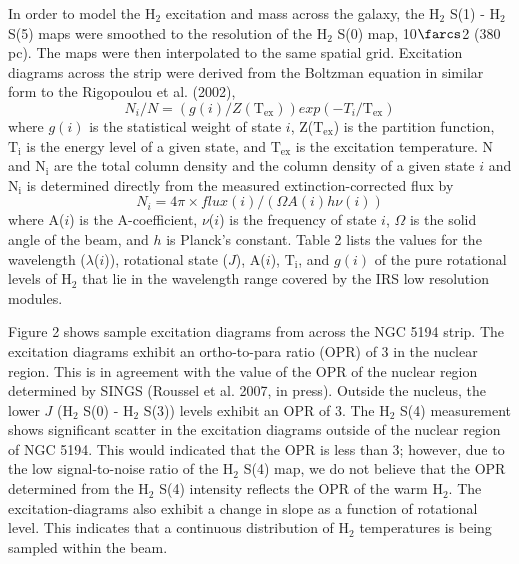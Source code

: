 \documentclass[manuscript]{aastex}
\begin{document}
In order to model the $\mathrm{H_2}$ excitation and mass across the galaxy, the $\mathrm{H_2}$ S(1) - $\mathrm{H_2}$ S(5) maps were smoothed to the resolution of the $\mathrm{H_2}$ S(0) map, 10$\farcs$2 (380 pc).  The maps were then interpolated to the same spatial grid.  Excitation diagrams across the strip were derived from the Boltzman equation in similar form to the Rigopoulou et al. (2002),
\begin{equation}
N_i/N = (g(i)/Z(\mathrm{T_{ex}}))exp(-T_i/\mathrm{T_{ex}})
\end{equation}
where $g(i)$ is the statistical weight of state $i$, Z($\mathrm{T_{ex}}$) is the partition function, $\mathrm{T_i}$ is the energy level of a given state, and $\mathrm{T_{ex}}$ is the excitation temperature.  N and $\mathrm{N_i}$ are the total column density and the column density of a given state $i$ and $\mathrm{N_i}$ is determined directly from the measured extinction-corrected flux by
\begin{equation}
N_i = 4 \pi \times flux(i)/(\Omega A(i)h\nu (i))
\end{equation}
where A($i$) is the A-coefficient,  $\nu$($i$) is the frequency of state $i$, $\Omega$ is the solid angle of the beam, and $h$ is Planck's constant.  Table 2 lists the values for the wavelength ($\lambda$($i$)), rotational state ($J$), A($i$), $\mathrm{T_i}$, and $g(i)$ of the pure rotational levels of $\mathrm{H_2}$ that lie in the wavelength range covered by the IRS low resolution modules. 

Figure 2 shows sample excitation diagrams from across the NGC 5194 strip.  The excitation diagrams exhibit an ortho-to-para ratio (OPR) of 3 in the nuclear region.  This is in agreement with the value of the OPR of the nuclear region determined by SINGS (Roussel et al. 2007, in press).  Outside the nucleus, the lower $J$ ($\mathrm{H_2}$ S(0) - $\mathrm{H_2}$ S(3)) levels exhibit an OPR of 3.  The $\mathrm{H_2}$ S(4) measurement shows significant scatter in the excitation diagrams outside of the nuclear region of NGC 5194.   This would indicated that the OPR is less than 3; however, due to the low signal-to-noise ratio of the $\mathrm{H_2}$ S(4) map,
we do not believe that the OPR determined from the $\mathrm{H_2}$ S(4) intensity reflects the OPR of the warm $\mathrm{H_2}$.  The excitation-diagrams also exhibit a change in slope as a function of rotational level.  This indicates that a continuous distribution of $\mathrm{H_2}$ temperatures is being sampled within the beam.
\end{document}
